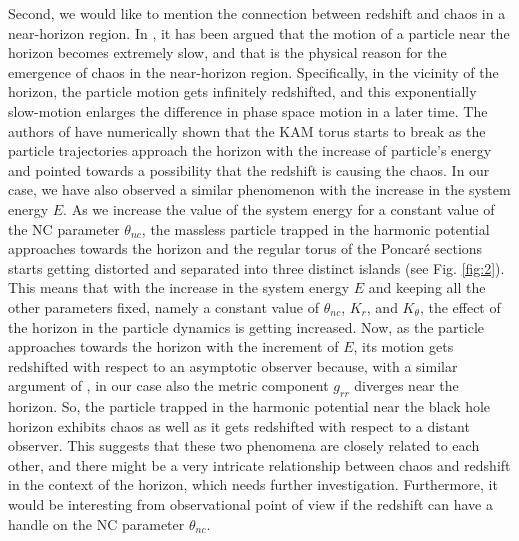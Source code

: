 \documentclass[aps,prd,showpacs,nofootinbib,floats,floatfix,preprintnumbers,groupedaddress,twocolumn]{revtex4-1}
\begin{document}
%
%
%
%
%
	Second, we would like to mention the connection between redshift and chaos in a near-horizon region. In \cite{Hashimoto:2016dfz}, it has been argued that the motion of a particle near the horizon becomes extremely slow, and that is the physical reason for the emergence of chaos in the near-horizon region. Specifically, in the vicinity of the horizon, the particle motion gets infinitely redshifted, and this exponentially slow-motion enlarges the difference in phase space motion in a later time. The authors of \cite{Hashimoto:2016dfz} have numerically shown that the KAM torus starts to break as the particle trajectories approach the horizon with the increase of particle's energy and pointed towards a possibility that the redshift is causing the chaos.
	In our case, we have also observed a similar phenomenon with the increase in the system energy $E$. As we increase the value of the system energy for a constant value of the NC parameter $\theta_{nc}$, the massless particle trapped in the harmonic potential approaches towards the horizon and the regular torus of the Poncar\'e sections starts getting distorted and separated into three distinct islands (see Fig. \ref{fig:2}). This means that with the increase in the system energy $E$ and keeping all the other parameters fixed, namely a constant value of $\theta_{nc}$, $K_r$, and $K_{\theta}$,  the effect of the horizon in the particle dynamics is getting increased. Now, as the particle approaches towards the horizon with the increment of $E$, its motion gets redshifted with respect to  an asymptotic observer because, with a similar argument of  \cite{Hashimoto:2016dfz}, in our case also the metric component $g_{rr}$ diverges near the horizon. So, the particle trapped in the harmonic potential near the black hole horizon exhibits chaos as well as it gets redshifted with respect to  a distant observer. This suggests that these two phenomena are closely related to each other, and there might be a very intricate relationship between chaos and redshift in the context of the horizon, which needs further investigation. Furthermore, it would be interesting from observational point of view if the redshift can have a handle on the NC parameter $\theta_{nc}$. 
%	
%	
%	
%	
\end{document}
